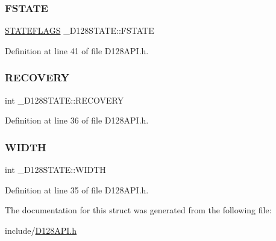 \subsubsection{\texorpdfstring{F\+S\+T\+A\+TE}{FSTATE}}
{\footnotesize\ttfamily \hyperlink{_d128_a_p_i_8h_ab368deca56a74b4f97e27c53f957322f}{S\+T\+A\+T\+E\+F\+L\+A\+GS} \+\_\+\+D128\+S\+T\+A\+T\+E\+::\+F\+S\+T\+A\+TE}



Definition at line 41 of file D128\+A\+P\+I.\+h.

\mbox{\label{struct___d128_s_t_a_t_e_aec50cf1e9df443c609e6253c8828c95a}} 
\subsubsection{\texorpdfstring{R\+E\+C\+O\+V\+E\+RY}{RECOVERY}}
{\footnotesize\ttfamily int \+\_\+\+D128\+S\+T\+A\+T\+E\+::\+R\+E\+C\+O\+V\+E\+RY}



Definition at line 36 of file D128\+A\+P\+I.\+h.

\mbox{\label{struct___d128_s_t_a_t_e_ae531b72a9e28645c9f99756a12a88fff}} 
\subsubsection{\texorpdfstring{W\+I\+D\+TH}{WIDTH}}
{\footnotesize\ttfamily int \+\_\+\+D128\+S\+T\+A\+T\+E\+::\+W\+I\+D\+TH}



Definition at line 35 of file D128\+A\+P\+I.\+h.



The documentation for this struct was generated from the following file\+:\begin{DoxyCompactItemize}
\item 
include/\hyperlink{_d128_a_p_i_8h}{D128\+A\+P\+I.\+h}\end{DoxyCompactItemize}
